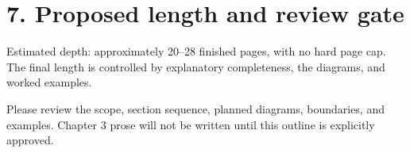 \section*{7. Proposed length and review gate}
Estimated depth: approximately 20--28 finished pages, with no hard page cap. The final length is controlled by explanatory completeness, the diagrams, and worked examples.

\begin{takeawaybox}
Please review the scope, section sequence, planned diagrams, boundaries, and examples. Chapter 3 prose will not be written until this outline is explicitly approved.
\end{takeawaybox}

